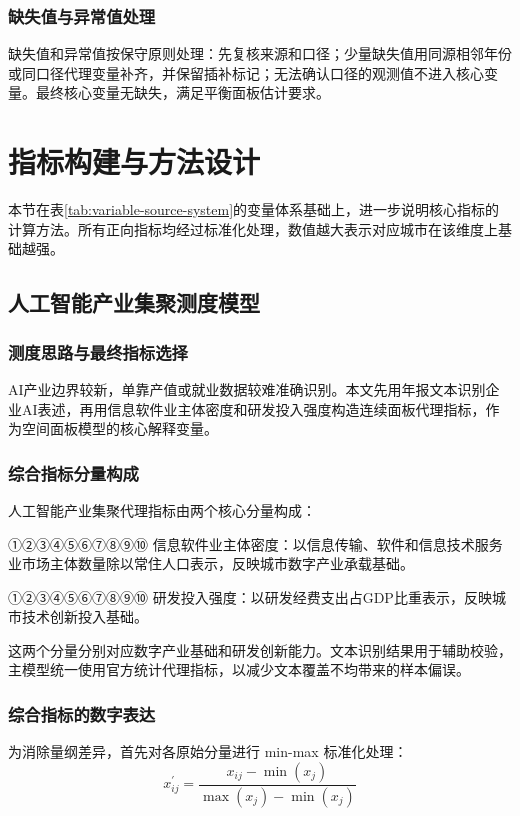 \documentclass[12pt, a4paper]{ctexart}
\newcommand{\circlednum}[1]{%
    \mbox{{\papersymbolfont\ifcase#1\or ①\or ②\or ③\or ④\or ⑤\or ⑥\or ⑦\or ⑧\or ⑨\or ⑩\else #1\fi}}%
}
\newcommand{\one}{\circlednum{1}}
\newcommand{\two}{\circlednum{2}}
\begin{document}
\subsubsection{缺失值与异常值处理}
缺失值和异常值按保守原则处理：先复核来源和口径；少量缺失值用同源相邻年份或同口径代理变量补齐，并保留插补标记；无法确认口径的观测值不进入核心变量。最终核心变量无缺失，满足平衡面板估计要求。

\section{指标构建与方法设计}

本节在表\ref{tab:variable-source-system}的变量体系基础上，进一步说明核心指标的计算方法。所有正向指标均经过标准化处理，数值越大表示对应城市在该维度上基础越强。

\subsection{人工智能产业集聚测度模型}
\subsubsection{测度思路与最终指标选择}
AI产业边界较新，单靠产值或就业数据较难准确识别。本文先用年报文本识别企业AI表述，再用信息软件业主体密度和研发投入强度构造连续面板代理指标，作为空间面板模型的核心解释变量。
\subsubsection{综合指标分量构成}
人工智能产业集聚代理指标由两个核心分量构成：

{\songti \one 信息软件业主体密度：}以信息传输、软件和信息技术服务业市场主体数量除以常住人口表示，反映城市数字产业承载基础。

{\songti \two 研发投入强度：}以研发经费支出占GDP比重表示，反映城市技术创新投入基础。

这两个分量分别对应数字产业基础和研发创新能力。文本识别结果用于辅助校验，主模型统一使用官方统计代理指标，以减少文本覆盖不均带来的样本偏误。

\subsubsection{综合指标的数字表达}
为消除量纲差异，首先对各原始分量进行 min-max 标准化处理：
\begin{equation}
    x_{ij}^{\prime}=\frac{x_{ij}-\min(x_j)}{\max(x_j)-\min(x_j)}
\end{equation}
\end{document}
